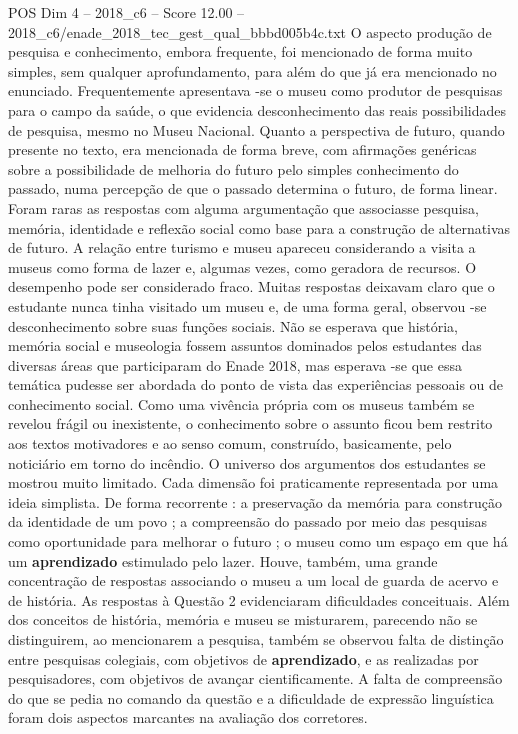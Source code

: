 \begin{textsample}{POS Dim 4 – 2018\_c6 – Score 12.00 – 2018\_c6/enade\_2018\_tec\_gest\_qual\_bbbd005b4c.txt}
O aspecto produção de pesquisa e conhecimento, embora frequente, foi mencionado de forma muito simples, sem qualquer aprofundamento, para além do que já era mencionado no enunciado.
Frequentemente apresentava -se o museu como produtor de pesquisas para o campo da saúde, o que evidencia desconhecimento das reais possibilidades de pesquisa, mesmo no Museu Nacional.
Quanto a perspectiva de futuro, quando presente no texto, era mencionada de forma breve, com afirmações genéricas sobre a possibilidade de melhoria do futuro pelo simples conhecimento do passado, numa percepção de que o passado determina o futuro, de forma linear.
Foram raras as respostas com alguma argumentação que associasse pesquisa, memória, identidade e reflexão social como base para a construção de alternativas de futuro.
A relação entre turismo e museu apareceu considerando a visita a museus como forma de lazer e, algumas vezes, como geradora de recursos.
O desempenho pode ser considerado fraco.
Muitas respostas deixavam claro que o estudante nunca tinha visitado um museu e, de uma forma geral, observou -se desconhecimento sobre suas funções sociais.
Não se esperava que história, memória social e museologia fossem assuntos dominados pelos estudantes das diversas áreas que participaram do Enade 2018, mas esperava -se que essa temática pudesse ser abordada do ponto de vista das experiências pessoais ou de conhecimento social.
Como uma vivência própria com os museus também se revelou frágil ou inexistente, o conhecimento sobre o assunto ficou bem restrito aos textos motivadores e ao senso comum, construído, basicamente, pelo noticiário em torno do incêndio.
O universo dos argumentos dos estudantes se mostrou muito limitado.
Cada dimensão foi praticamente representada por uma ideia simplista.
De forma recorrente : a preservação da memória para construção da identidade de um povo ; a compreensão do passado por meio das pesquisas como oportunidade para melhorar o futuro ; o museu como um espaço em que há um \textbf{aprendizado} estimulado pelo lazer.
Houve, também, uma grande concentração de respostas associando o museu a um local de guarda de acervo e de história.
As respostas à Questão 2 evidenciaram dificuldades conceituais.
Além dos conceitos de história, memória e museu se misturarem, parecendo não se distinguirem, ao mencionarem a pesquisa, também se observou falta de distinção entre pesquisas colegiais, com objetivos de \textbf{aprendizado}, e as realizadas por pesquisadores, com objetivos de avançar cientificamente.
A falta de compreensão do que se pedia no comando da questão e a dificuldade de expressão linguística foram dois aspectos marcantes na avaliação dos corretores.

\end{textsample}
